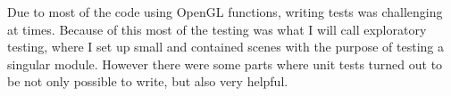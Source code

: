 
Due to most of the code using OpenGL functions,
writing tests was challenging at times.
Because of this most of the testing was what I will call exploratory testing,
where I set up small and contained scenes with the purpose of testing a singular module.
However there were some parts where unit tests turned out to be not only possible to write,
but also very helpful.
